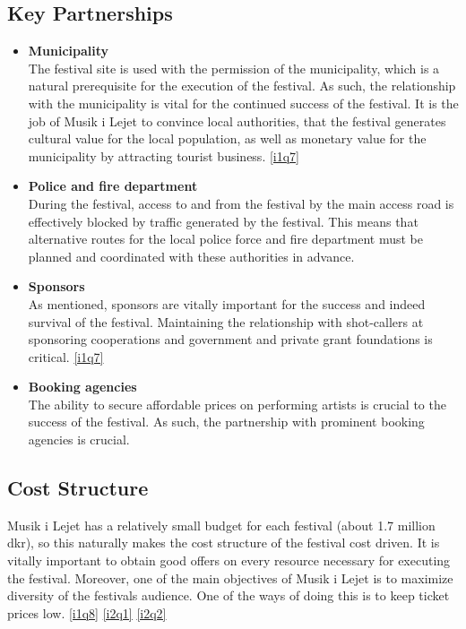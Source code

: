 \subsection{Key Partnerships} %
\label{sub:key_partnerships}
\begin{itemize}
	\item \textbf{Municipality}\\
	The festival site is used with the permission of the municipality, which is a natural prerequisite for the execution of the festival. As such, the relationship with the municipality is vital for the continued success of the festival. It is the job of Musik i Lejet to convince local authorities, that the festival generates cultural value for the local population, as well as monetary value for the municipality  by attracting tourist business. \ref{i1q7}
	\item \textbf{Police and fire department}\\
	During the festival, access to and from the festival by the main access road is effectively blocked by traffic generated by the festival. This means that alternative routes for the local police force and fire department must be planned and coordinated with these authorities in advance. \
	\item \textbf{Sponsors}\\
	As mentioned, sponsors are vitally important for the success and indeed survival of the festival. Maintaining the relationship with shot-callers at sponsoring cooperations and government and private grant foundations is critical. \ref{i1q7}
	\item \textbf{Booking agencies}\\
	The ability to secure affordable prices on performing artists is crucial to the success of the festival. As such, the partnership with prominent booking agencies is crucial.
\end{itemize}

\subsection{Cost Structure} %
\label{sub:cost_structure}
Musik i Lejet has a relatively small budget for each festival (about 1.7 million dkr), so this naturally makes the cost structure of the festival cost driven. It is vitally important to obtain good offers on every resource necessary for executing the festival. Moreover, one of the main objectives of Musik i Lejet is to maximize diversity of the festivals audience. One of the ways of doing this is to keep ticket prices low. \ref{i1q8} \ref{i2q1} \ref{i2q2}